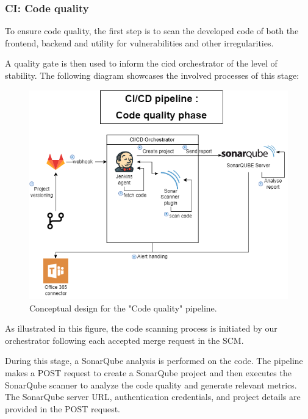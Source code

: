 \newpage

\subsubsection{CI: Code quality }

\hspace{7mm}To ensure code quality, the first step is to scan the developed code of both the frontend, backend and utility for vulnerabilities and other irregularities.  

\hspace{7mm}A quality gate is then used to inform the cicd orchestrator of the level of stability. The following diagram showcases the involved processes of this stage: 

\begin{figure}[H]\centering
\includegraphics[width=1.0\textwidth,angle=00]{assets/f48.png}
\caption{ Conceptual design for the "Code quality" pipeline.}
\label{fig:conceptual design of Code quality }
\end{figure}

\hspace{7mm}As illustrated in this figure, the code scanning process is initiated by our orchestrator following each accepted merge request in the SCM.

\hspace{7mm}During this stage, a SonarQube analysis is performed on the code. The pipeline makes a POST request to create a SonarQube project and then executes the SonarQube scanner to analyze the code quality and generate relevant metrics. The SonarQube server URL, authentication credentials, and project details are provided in the POST request.

